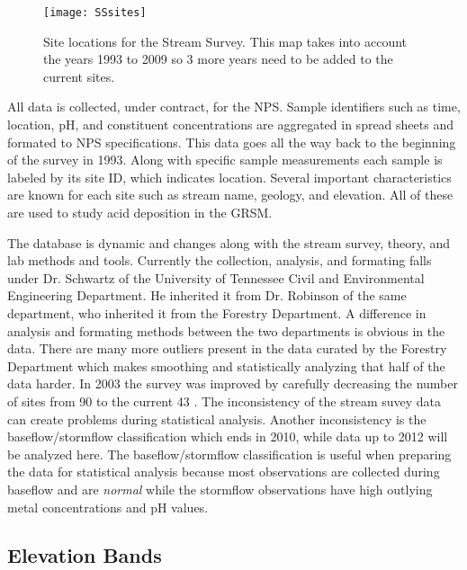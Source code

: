 \begin{figure}[h!]
  \centering
  \texttt{[image: SSsites]}\\
  \caption{Site locations for the Stream Survey.  This map takes into account the years 1993 to 2009 so 3 more years need to be added to the current sites. }\label{fig:SSsites}
\end{figure}

All data is collected, under contract, for the NPS.
Sample identifiers such as time, location, pH, and constituent concentrations are aggregated in spread sheets and formated to NPS specifications.
This data goes all the way back to the beginning of the survey in 1993.
Along with specific sample measurements each sample is labeled by its site ID, which indicates location.
Several important characteristics are known for each site such as stream name, geology, and elevation.
All of these are used to study acid deposition in the GRSM.

The database is dynamic and changes along with the stream survey, theory,  and lab methods and tools.
Currently the collection, analysis, and formating falls under Dr. Schwartz of the University of Tennessee Civil and Environmental Engineering Department.
He inherited it from Dr. Robinson of the same department, who inherited it from the Forestry Department.
A difference in analysis and formating methods between the two departments is obvious in the data.
There are many more outliers present in the data curated by the Forestry Department which makes smoothing and statistically analyzing that half of the data harder.
In 2003 the survey was improved by carefully decreasing the number of  sites from 90 to the current 43 \citep{odom2003}.
The inconsistency of the stream suvey data can create problems during statistical analysis.
Another inconsistency is the baseflow/stormflow classification which ends in 2010, while data up to 2012 will be analyzed here.
The baseflow/stormflow classification is useful when preparing the data for statistical analysis because most observations are collected during baseflow and are \textit{normal} while the stormflow observations have high outlying metal concentrations and pH values.

\subsection{Elevation Bands}

